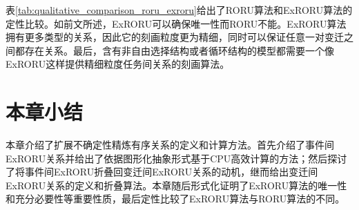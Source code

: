表\ref{tab:qualitative_comparison_roru_exroru}给出了RORU算法和ExRORU算法的定性比较。如前文所述，ExRORU可以确保唯一性而RORU不能。ExRORU算法拥有更多类型的关系，因此它的刻画粒度更为精细，同时可以保证任意一对变迁之间都存在关系。最后，含有非自由选择结构或者循环结构的模型都需要一个像ExRORU这样提供精细粒度任务间关系的刻画算法。

\section{本章小结}\label{sec:exroru_conclusion}
本章介绍了扩展不确定性精炼有序关系的定义和计算方法。首先介绍了事件间ExRORU关系并给出了依据图形化抽象形式基于CPU高效计算的方法；然后探讨了将事件间ExRORU折叠回变迁间ExRORU关系的动机，继而给出变迁间ExRORU关系的定义和折叠算法。本章随后形式化证明了ExRORU算法的唯一性和充分必要性等重要性质，最后定性比较了ExRORU算法与RORU算法的不同。